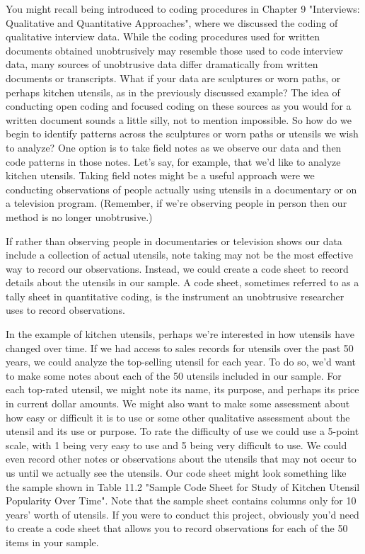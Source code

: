 You might recall being introduced to coding procedures in Chapter 9 "Interviews: Qualitative and Quantitative Approaches", where we discussed the coding of qualitative interview data. While the coding procedures used for written documents obtained unobtrusively may resemble those used to code interview data, many sources of unobtrusive data differ dramatically from written documents or transcripts. What if your data are sculptures or worn paths, or perhaps kitchen utensils, as in the previously discussed example? The idea of conducting open coding and focused coding on these sources as you would for a written document sounds a little silly, not to mention impossible. So how do we begin to identify patterns across the sculptures or worn paths or utensils we wish to analyze? One option is to take field notes as we observe our data and then code patterns in those notes. Let’s say, for example, that we’d like to analyze kitchen utensils. Taking field notes might be a useful approach were we conducting observations of people actually using utensils in a documentary or on a television program. (Remember, if we’re observing people in person then our method is no longer unobtrusive.)

If rather than observing people in documentaries or television shows our data include a collection of actual utensils, note taking may not be the most effective way to record our observations. Instead, we could create a code sheet to record details about the utensils in our sample. A code sheet, sometimes referred to as a tally sheet in quantitative coding, is the instrument an unobtrusive researcher uses to record observations.

In the example of kitchen utensils, perhaps we’re interested in how utensils have changed over time. If we had access to sales records for utensils over the past 50 years, we could analyze the top-selling utensil for each year. To do so, we’d want to make some notes about each of the 50 utensils included in our sample. For each top-rated utensil, we might note its name, its purpose, and perhaps its price in current dollar amounts. We might also want to make some assessment about how easy or difficult it is to use or some other qualitative assessment about the utensil and its use or purpose. To rate the difficulty of use we could use a 5-point scale, with 1 being very easy to use and 5 being very difficult to use. We could even record other notes or observations about the utensils that may not occur to us until we actually see the utensils. Our code sheet might look something like the sample shown in Table 11.2 "Sample Code Sheet for Study of Kitchen Utensil Popularity Over Time". Note that the sample sheet contains columns only for 10 years’ worth of utensils. If you were to conduct this project, obviously you’d need to create a code sheet that allows you to record observations for each of the 50 items in your sample.


